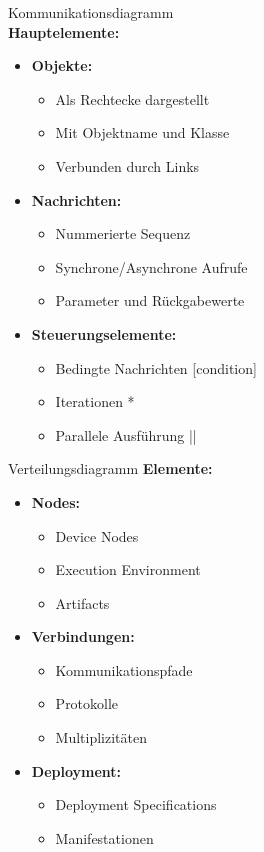 \begin{definition}{Kommunikationsdiagramm}\\
\textbf{Hauptelemente:}
\begin{itemize}
    \item \textbf{Objekte:}
    \begin{itemize}
        \item Als Rechtecke dargestellt
        \item Mit Objektname und Klasse
        \item Verbunden durch Links
    \end{itemize}
    
    \item \textbf{Nachrichten:}
    \begin{itemize}
        \item Nummerierte Sequenz
        \item Synchrone/Asynchrone Aufrufe
        \item Parameter und Rückgabewerte
    \end{itemize}
    
    \item \textbf{Steuerungselemente:}
    \begin{itemize}
        \item Bedingte Nachrichten [condition]
        \item Iterationen *
        \item Parallele Ausführung || 
    \end{itemize}
\end{itemize}
\end{definition}

\begin{definition}{Verteilungsdiagramm}
\textbf{Elemente:}
\begin{itemize}
    \item \textbf{Nodes:}
    \begin{itemize}
        \item Device Nodes
        \item Execution Environment
        \item Artifacts
    \end{itemize}
    
    \item \textbf{Verbindungen:}
    \begin{itemize}
        \item Kommunikationspfade
        \item Protokolle
        \item Multiplizitäten
    \end{itemize}
    
    \item \textbf{Deployment:}
    \begin{itemize}
        \item Deployment Specifications
        \item Manifestationen
    \end{itemize}
\end{itemize}
\end{definition}

